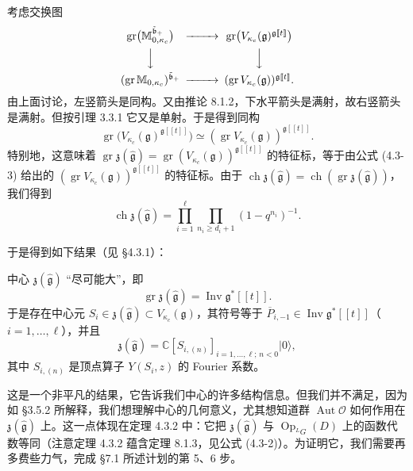 考虑交换图
\[
    \begin{CD}
    \operatorname{gr}\bigl(\mathbb M^{\tilde{\mathfrak b}_+}_{0,\kappa_c}\bigr) @>>> \operatorname{gr}\bigl(V_{\kappa_c}(\mathfrak g)^{\mathfrak g[\![t]\!]}\bigr)\\
    @VVV @VVV\\
    (\operatorname{gr}\mathbb M_{0,\kappa_c})^{\tilde{\mathfrak b}_+} @>>> (\operatorname{gr}V_{\kappa_c}(\mathfrak g))^{\mathfrak g[\![t]\!]}.
    \end{CD}
\]
由上面讨论，左竖箭头是同构。又由推论 8.1.2，下水平箭头是满射，故右竖箭头是满射。但按引理 3.3.1 它又是单射。于是得到同构
\[
    \operatorname{gr}\bigl(V_{\kappa_c}(\mathfrak g)^{\mathfrak g[\![t]\!]}\bigr)\simeq(\operatorname{gr}V_{\kappa_c}(\mathfrak g))^{\mathfrak g[\![t]\!]}.
\]
特别地，这意味着 $\operatorname{gr}\mathfrak z(\hat{\mathfrak g})=\operatorname{gr}(V_{\kappa_c}(\mathfrak g))^{\mathfrak g[\![t]\!]}$ 的特征标，等于由公式 (4.3-3) 给出的 $(\operatorname{gr}V_{\kappa_c}(\mathfrak g))^{\mathfrak g[\![t]\!]}$ 的特征标。由于 $\operatorname{ch}\mathfrak z(\hat{\mathfrak g})=\operatorname{ch}(\operatorname{gr}\mathfrak z(\hat{\mathfrak g}))$，我们得到
\begin{equation}
    \operatorname{ch}\mathfrak z(\hat{\mathfrak g})=\prod_{i=1}^{\ell}\prod_{n_i\ge d_i+1}(1-q^{n_i})^{-1}.
    \tag{8.1-5}
\end{equation}

于是得到如下结果（见 §4.3.1）：

\begin{theorem}
    中心 $\mathfrak z(\hat{\mathfrak g})$ “尽可能大”，即
    \[
        \operatorname{gr}\mathfrak z(\hat{\mathfrak g})=\operatorname{Inv}\mathfrak g^*[\![t]\!].
    \]
    于是存在中心元 $S_i\in\mathfrak z(\hat{\mathfrak g})\subset V_{\kappa_c}(\mathfrak g)$，其符号等于 $\overline P_{i,-1}\in\operatorname{Inv}\mathfrak g^*[\![t]\!]$（$i=1,\dots,\ell$），并且
    \[
        \mathfrak z(\hat{\mathfrak g})=\mathbb C[S_{i,(n)}]_{i=1,\dots,\ell;\,n<0}|0\rangle,
    \]
    其中 $S_{i,(n)}$ 是顶点算子 $Y(S_i,z)$ 的 Fourier 系数。
\end{theorem}

这是一个非平凡的结果，它告诉我们中心的许多结构信息。但我们并不满足，因为如 §3.5.2 所解释，我们想理解中心的几何意义，尤其想知道群 $\operatorname{Aut}\mathcal O$ 如何作用在 $\mathfrak z(\hat{\mathfrak g})$ 上。这一点体现在定理 4.3.2 中：它把 $\mathfrak z(\hat{\mathfrak g})$ 与 $\operatorname{Op}_{{}^LG}(D)$ 上的函数代数等同（注意定理 4.3.2 蕴含定理 8.1.3，见公式 (4.3-2)）。为证明它，我们需要再多费些力气，完成 §7.1 所述计划的第 5、6 步。

